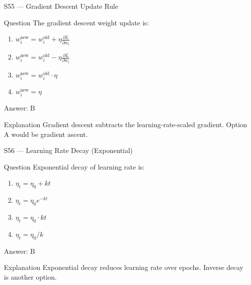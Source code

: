\documentclass[aspectratio=169,8pt]{beamer}
\begin{document}
	\begin{frame}{S55 --- Gradient Descent Update Rule}
		\begin{block}{Question}
			The gradient descent weight update is:
			\begin{enumerate}
				\item $w_i^{\text{new}} = w_i^{\text{old}} + \eta \frac{\partial L}{\partial w_i}$
				\item $w_i^{\text{new}} = w_i^{\text{old}} - \eta \frac{\partial L}{\partial w_i}$
				\item $w_i^{\text{new}} = w_i^{\text{old}} \cdot \eta$
				\item $w_i^{\text{new}} = \eta$
			\end{enumerate}
		\end{block}
		\begin{exampleblock}{Answer: B}\end{exampleblock}
		\begin{block}{Explanation}
			Gradient descent subtracts the learning-rate-scaled gradient. Option A would be gradient ascent.
		\end{block}
	\end{frame}
	
	\begin{frame}{S56 --- Learning Rate Decay (Exponential)}
		\begin{block}{Question}
			Exponential decay of learning rate is:
			\begin{enumerate}
				\item $\eta_t = \eta_0 + kt$
				\item $\eta_t = \eta_0 e^{-kt}$
				\item $\eta_t = \eta_0 \cdot kt$
				\item $\eta_t = \eta_0/k$
			\end{enumerate}
		\end{block}
		\begin{exampleblock}{Answer: B}\end{exampleblock}
		\begin{block}{Explanation}
			Exponential decay reduces learning rate over epochs. Inverse decay is another option.
		\end{block}
	\end{frame}
	
\end{document}
